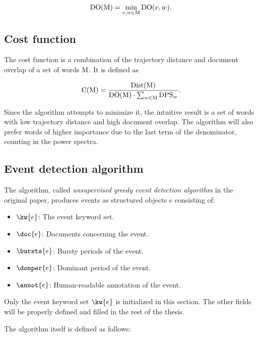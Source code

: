 \begin{equation} \label{eq:document-overlap}
	\text{DO}( \text{M} ) = \min_{v, w \in \text{M}} \text{DO}( v, w ).
\end{equation}

\subsection{Cost function}
The cost function is a combination of the trajectory distance and document overlap of a set of words $\text{M}$. It is defined as

\begin{equation} \label{eq:cost-function-original}
	\text{C}( \text{M} ) = \frac{\text{Dist}( \text{M} )}{\text{DO}( \text{M} ) \cdot \sum_{w \in \text{M}} \text{DPS}_{w}}.
\end{equation}

Since the algorithm attempts to minimize it, the intuitive result is a set of words with low trajectory distance and high document overlap. The algorithm will also prefer words of higher importance due to the last term of the denominator, counting in the power spectra.


\subsection{Event detection algorithm}
The algorithm, called \textit{unsupervised greedy event detection algorithm} in the original paper, produces events as structured objects $e$ consisting of:

\begin{itemize}
	\item $\kw{e}$: The event keyword set.
	\item $\doc{e}$: Documents concerning the event.
	\item $\bursts{e}$: Bursty periods of the event.
	\item $\domper{e}$: Dominant period of the event.
	\item $\annot{e}$: Human-readable annotation of the event.
\end{itemize}

Only the event keyword set $\kw{e}$ is initialized in this section. The other fields will be properly defined and filled in the rest of the thesis.

The algorithm itself is defined as follows:

